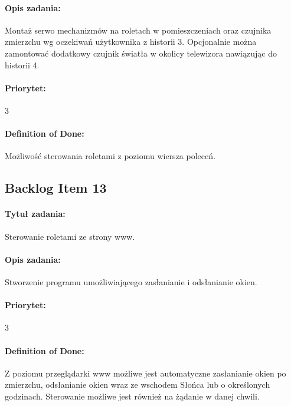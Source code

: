 	\paragraph{Opis zadania:} 
	Montaż serwo mechanizmów na roletach w pomieszczeniach oraz czujnika zmierzchu wg oczekiwań użytkownika z historii 3. Opcjonalnie można zamontować dodatkowy czujnik światła w okolicy telewizora nawiązując do historii 4.
	
	\paragraph{Priorytet:}
	3
	
	\paragraph{Definition of Done:}
	Możliwość sterowania roletami z poziomu wiersza poleceń.



	\subsection{Backlog Item 13}
	\paragraph{Tytuł zadania:}
	Sterowanie roletami ze strony www.
	
	\paragraph{Opis zadania:} 
	Stworzenie programu umożliwiającego zasłanianie i odsłanianie okien.
	
	\paragraph{Priorytet:}
	3
	
	\paragraph{Definition of Done:}
	Z poziomu przeglądarki www możliwe jest automatyczne zasłanianie okien po zmierzchu, odsłanianie okien wraz ze wschodem Słońca lub o określonych godzinach. Sterowanie możliwe jest również na żądanie w danej chwili.


	
